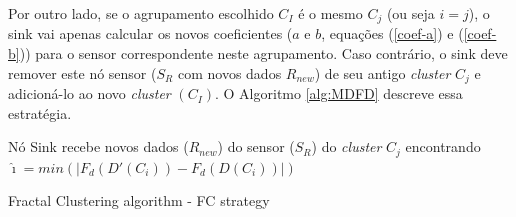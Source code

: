 \documentclass{acm_proc_article-sp}
\begin{document}
Por outro lado, se o agrupamento escolhido $C_I$ é o mesmo $C_j$ (ou seja 
$i = j$), o sink vai apenas calcular os novos coeficientes ($a$ e $b$, equações 
(\ref{coef-a}) e (\ref{coef-b})) para o sensor correspondente neste agrupamento. 
Caso contrário, o sink deve remover este nó sensor ($S_{R}$ com novos dados 
$R_{new}$) de seu antigo {\it cluster} $C_j$ e adicioná-lo ao novo {\it cluster} $(C_I)$.
O Algoritmo \ref{alg:MDFD} descreve essa estratégia.
\vspace*{-.3cm}

\begin{algorithm}
 \SetAlgoLined
 \LinesNumbered
 \small
  Nó Sink recebe novos dados ($R_{new}$) do sensor ($S_{R}$) do {\it cluster} $C_j$\;
   encontrando $\hat{\imath} = min(|F_d(D'(C_i)) - F_d(D(C_i))|)$\;
 \caption{Fractal Clustering algorithm - FC strategy}
 \label{alg:MDFD}
\end{algorithm}
\end{document}
